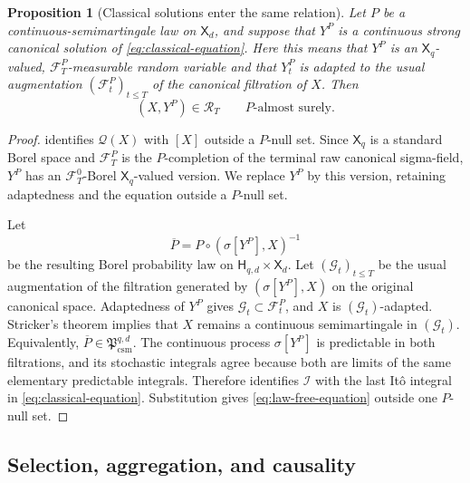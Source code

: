 \documentclass[11pt,reqno]{amsart}
\theoremstyle{plain}
\newtheorem{proposition}[proposition]{Proposition}
\theoremstyle{definition}
\newcommand{\cF}{\mathcal F}
\newcommand{\cI}{\mathcal I}
\newcommand{\cR}{\mathcal R}
\newcommand{\qv}{\mathcal Q}
\begin{document}
\begin{proposition}[Classical solutions enter the same relation]
\label{prop:classical-enters-relation}
Let \(P\) be a continuous-semimartingale law on \(\mathsf X_d\), and suppose
that \(Y^P\) is a continuous strong canonical solution of
\eqref{eq:classical-equation}.  Here this means that \(Y^P\) is an
\(\mathsf X_q\)-valued, \(\cF_T^P\)-measurable random variable and that
\(Y_t^P\) is adapted to the usual augmentation
\((\cF_t^P)_{t\le T}\) of the canonical filtration of \(X\).  Then
\begin{equation}\label{eq:classical-in-relation}
  (X,Y^P)\in\cR_T
  \qquad P\text{-almost surely}.
\end{equation}
\end{proposition}

\begin{proof}
 identifies \(\qv(X)\) with \([X]\) outside a
\(P\)-null set.  Since \(\mathsf X_q\) is a standard Borel space and
\(\cF_T^P\) is the \(P\)-completion of the terminal raw canonical
sigma-field, \(Y^P\) has an \(\cF_T^0\)-Borel
\(\mathsf X_q\)-valued version.  We replace \(Y^P\) by this version, retaining
adaptedness and the equation outside a \(P\)-null set.

Let
\[
  \overline P
  =
  P\circ(\sigma[Y^P],X)^{-1}
\]
be the resulting Borel probability law on
\(\mathsf H_{q,d}\times\mathsf X_d\).  Let \((\mathcal G_t)_{t\le T}\) be
the usual augmentation of the filtration generated by
\((\sigma[Y^P],X)\) on the original canonical space.  Adaptedness of \(Y^P\)
gives \(\mathcal G_t\subset\cF_t^P\), and \(X\) is
\((\mathcal G_t)\)-adapted.  Stricker's theorem \cite{Protter05} implies
that \(X\) remains a continuous semimartingale in \((\mathcal G_t)\).
Equivalently,
\(\overline P\in\mathfrak P_{\mathrm{csm}}^{q,d}\).  The continuous process
\(\sigma[Y^P]\) is predictable in both filtrations, and its stochastic
integrals agree because both are limits of the same elementary predictable
integrals.  Therefore  identifies
\(\cI\) with the last It\^o integral in \eqref{eq:classical-equation}.
Substitution gives \eqref{eq:law-free-equation} outside one \(P\)-null set.
\end{proof}

\subsection{Selection, aggregation, and causality}
\end{document}
